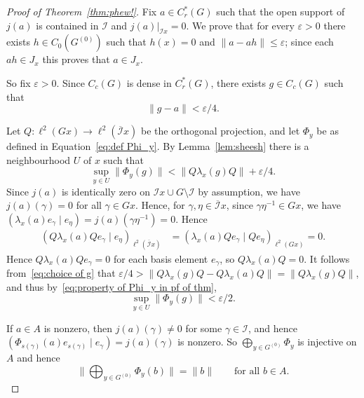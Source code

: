 \documentclass[a4paper, 12pt]{amsart}
\theoremstyle{plain}
\theoremstyle{definition}
\theoremstyle{remark}
\newcommand{\Ii}{\mathcal{I}}
\newcommand{\Iicl}{\overline{\mathcal{I}}}
\numberwithin{equation}{section}
\begin{document}
\begin{proof}[Proof of Theorem~\ref{thm:phew!}]
Fix $a \in C^*_r(G)$ such that the open support of $j(a)$ is contained in
$\Ii$ and $j(a)|_{\Ii x} = 0$. We prove that for every $\varepsilon
> 0$ there exists $h \in C_0(G^{(0)})$ such that $h(x) = 0$ and $\|a - ah\|
\le \varepsilon$; since each $ah \in J_x$ this proves that $a \in J_x$.

So
fix $\varepsilon > 0$.
Since $C_c(G)$ is dense in $C^*_r(G)$, there exists $g \in C_c(G)$ such that
\begin{equation}\label{eq:choice of g}
    \|g - a\| < \varepsilon/4.
\end{equation}

Let $Q \colon \ell^2(Gx) \to \ell^2(\Iicl x)$ be the orthogonal projection, and let $\Phi_y$ be as defined in Equation~\eqref{eq:def Phi_y}. By
Lemma~\ref{lem:sheesh} there is a neighbourhood $U$ of $x$ such that
\begin{equation}\label{eq:property of Phi_y in pf of thm}
    \sup_{y\in U}\|\Phi_y(g)\| < \|Q \lambda_x(g) Q\| + \varepsilon/4.
\end{equation}
Since $j(a)$ is identically zero on $\Ii x \cup G\setminus\Ii$ by assumption, we
have $j(a)(\gamma) = 0$ for all $\gamma \in Gx$. Hence, for $\gamma,\eta \in
\Iicl x$, since $\gamma\eta^{-1} \in Gx$, we have $( \lambda_x(a) e_\gamma \mid e_\eta ) = j(a)(\gamma\eta^{-1}) = 0$. Hence
\begin{align*}
( Q \lambda_x(a)Q e_\gamma \mid e_\eta )_{\ell^2(\Iicl x)}
    &= ( \lambda_x(a)Q e_\gamma \mid Q e_\eta )_{\ell^2(Gx)}
	 = 0.
\end{align*}
Hence $Q \lambda_x(a)Q e_\gamma = 0$ for each basis element $e_\gamma$, so $Q \lambda_x(a) Q = 0$. It follows from~\eqref{eq:choice of g} that
$\varepsilon/4 > \|Q\lambda_x(g)Q - Q\lambda_x(a)Q\| = \|Q \lambda_x(g) Q\|$, and thus by~\eqref{eq:property of Phi_y in pf of thm},
\begin{equation}\label{eq:sup over U estimate}
    \sup_{y \in U} \|\Phi_y(g)\| < \varepsilon/2.
\end{equation}

If $a \in A$ is nonzero, then $j(a)(\gamma) \not= 0$ for some $\gamma \in
\Ii$, and hence $( \Phi_{s(\gamma)}(a) e_{s(\gamma)} \mid e_\gamma) =
j(a)(\gamma)$ is nonzero. So $\bigoplus_{y \in G^{(0)}} \Phi_y$ is injective
on $A$ and hence
\begin{equation}\label{eq:oplus Phi isometric}
\Big\|\bigoplus_{y \in G^{(0)}} \Phi_y(b)\Big\| = \|b\|\qquad\text{for all $b \in A$.}
\end{equation}


\end{proof}
\end{document}
